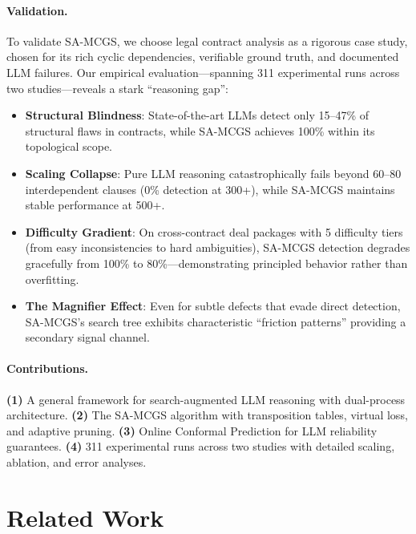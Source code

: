 \documentclass{article}
\begin{document}
\paragraph{Validation.}
To validate SA-MCGS, we choose legal contract analysis as a rigorous case study, chosen for its rich cyclic dependencies, verifiable ground truth, and documented LLM failures. Our empirical evaluation---spanning 311 experimental runs across two studies---reveals a stark ``reasoning gap'':

\begin{itemize}[leftmargin=*,itemsep=2pt]
    \item \textbf{Structural Blindness}: State-of-the-art LLMs detect only 15--47\% of structural flaws in contracts, while SA-MCGS achieves 100\% within its topological scope.
    \item \textbf{Scaling Collapse}: Pure LLM reasoning catastrophically fails beyond 60--80 interdependent clauses (0\% detection at 300+), while SA-MCGS maintains stable performance at 500+.
    \item \textbf{Difficulty Gradient}: On cross-contract deal packages with 5 difficulty tiers (from easy inconsistencies to hard ambiguities), SA-MCGS detection degrades gracefully from 100\% to 80\%---demonstrating principled behavior rather than overfitting.
    \item \textbf{The Magnifier Effect}: Even for subtle defects that evade direct detection, SA-MCGS's search tree exhibits characteristic ``friction patterns'' providing a secondary signal channel.
\end{itemize}

\paragraph{Contributions.}
\textbf{(1)} A general framework for search-augmented LLM reasoning with dual-process architecture.
\textbf{(2)} The SA-MCGS algorithm with transposition tables, virtual loss, and adaptive pruning.
\textbf{(3)} Online Conformal Prediction for LLM reliability guarantees.
\textbf{(4)} 311 experimental runs across two studies with detailed scaling, ablation, and error analyses.

\section{Related Work}
\end{document}
